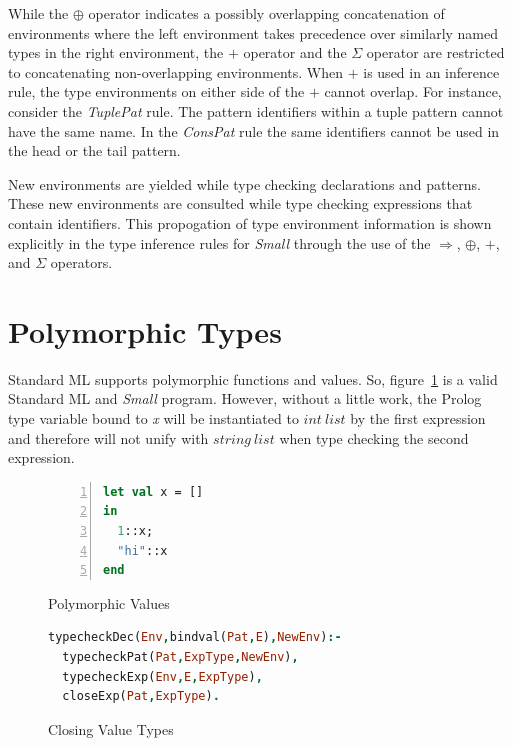 \documentclass[10pt]{luthercs}
\begin{document}
While the $\oplus$ operator indicates a possibly overlapping concatenation of environments where the left environment takes precedence over similarly named types in the right environment, the $+$ operator and the $\Sigma$ operator are restricted to concatenating non-overlapping environments. When $+$ is used in an inference rule, the type environments on either side of the $+$ cannot overlap. For instance, consider the {\em TuplePat} rule. The pattern identifiers within a tuple pattern cannot have the same name. In the {\em ConsPat} rule the same identifiers cannot be used in the head or the tail pattern.

New environments are yielded while type checking declarations and patterns. These new environments are consulted while type checking expressions that contain identifiers.  This propogation of type environment information is shown explicitly in the type inference rules for {\em Small} through the use of the $\Rightarrow$, $\oplus$, $+$, and $\Sigma$ operators. 

\section{Polymorphic Types}

Standard ML supports polymorphic functions and values. So, figure~\ref{valuepoly} is a valid Standard ML and {\em Small} program. However, without a little work, the Prolog type variable bound to {\em x} will be instantiated to $int~list$ by the first expression and therefore will not unify with $string~list$ when type checking the second expression.

\begin{figure}[htbp]
\begin{lstlisting}[language=ML,numbers=left,numberstyle=\tiny]
let val x = []
in
  1::x;
  "hi"::x
end
\end{lstlisting}
\caption{Polymorphic Values}
\label{valuepoly}
\end{figure}

\begin{figure}[htbp]
\begin{lstlisting}[language=Prolog]
typecheckDec(Env,bindval(Pat,E),NewEnv):- 
  typecheckPat(Pat,ExpType,NewEnv), 
  typecheckExp(Env,E,ExpType), 
  closeExp(Pat,ExpType).
\end{lstlisting}
\caption{Closing Value Types}
\label{valdec}
\end{figure}
\end{document}
